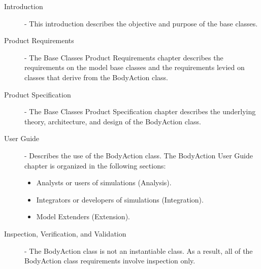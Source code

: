 \begin{description}
\item[Introduction] -
This introduction describes the objective and purpose of the base classes.

\item[Product Requirements] -
The \ModelDesc Base Classes Product Requirements chapter describes
the requirements on the model base classes
and the requirements levied on classes that derive from the BodyAction class.

\item[Product Specification] -
The \ModelDesc Base Classes Product Specification chapter describes
the underlying theory, architecture, and design of the
BodyAction class.

\item[User Guide] -
Describes the use of the BodyAction class.
The BodyAction User Guide chapter is organized in
the following sections:
\begin{itemize}
 \item Analysts or users of simulations (Analysis).
 \item Integrators or developers of simulations (Integration).
 \item Model Extenders (Extension).
\end{itemize}

\item[Inspection, Verification, and Validation] -
The BodyAction class is not an instantiable class.
As a result, all of the BodyAction class requirements involve inspection only.
\end{description}

